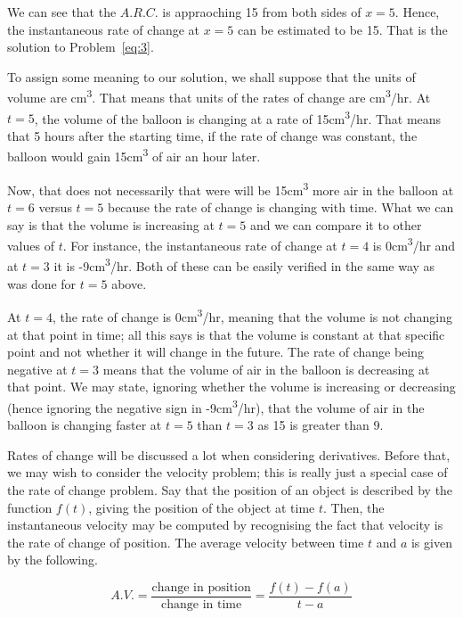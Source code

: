 \documentclass[12pt]{article}
\theoremstyle{definition}
\begin{document}
We can see that the $A.R.C.$ is appraoching 15 from both sides of $x=5$.
Hence, the instantaneous rate of change at $x=5$ can be estimated to be 15.
That is the solution to Problem~\eqref{eq:3}.

To assign some meaning to our solution, we shall suppose that the units of volume are \si{cm^3}.
That means that units of the rates of change are \si[per-mode=symbol]{cm^3/hr}.
At $t=5$, the volume of the balloon is changing at a rate of 15\si[per-mode=symbol]{cm^3/hr}.
That means that 5 hours after the starting time, if the rate of change was constant, the balloon would gain 15\si{cm^3} of air an hour later.

Now, that does not necessarily that were will be 15\si{cm^3} more air in the balloon at $t=6$ versus $t=5$ because the rate of change is changing with time.
What we can say is that the volume is increasing at $t=5$ and we can compare it to other values of $t$.
For instance, the instantaneous rate of change at $t=4$ is 0\si[per-mode=symbol]{cm^3/hr} and at $t=3$ it is -9\si[per-mode=symbol]{cm^3/hr}.
Both of these can be easily verified in the same way as was done for $t=5$ above.

At $t=4$, the rate of change is 0\si[per-mode=symbol]{cm^3/hr}, meaning that the volume is not changing at that point in time; all this says is that the volume is constant at that specific point and not whether it will change in the future.
The rate of change being negative at $t=3$ means that the volume of air in the balloon is decreasing at that point.
We may state, ignoring whether the volume is increasing or decreasing (hence ignoring the negative sign in -9\si[per-mode=symbol]{cm^3/hr}), that the volume of air in the balloon is changing faster at $t=5$ than $t=3$ as 15 is greater than 9.

Rates of change will be discussed a lot when considering derivatives.
Before that, we may wish to consider the velocity problem; this is really just a special case of the rate of change problem.
Say that the position of an object is described by the function $f(t)$, giving the position of the object at time $t$.
Then, the instantaneous velocity may be computed by recognising the fact that velocity is the rate of change of position.
The average velocity between time $t$ and $a$ is given by the following.

\begin{equation}
    A.V. = \frac{\text{change in position}}{\text{change in time}} = \frac{f(t)-f(a)}{t-a}
\end{equation}
\end{document}
